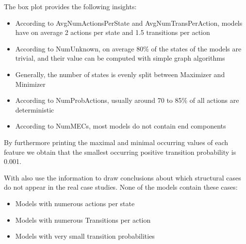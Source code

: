 \FloatBarrier
The box plot provides the following insights:
\begin{itemize} \label{insights:realDistribution}
    \item According to AvgNumActionsPerState and AvgNumTransPerAction, models have on average 2 actions per state and 1.5 transitions per action
    \item According to NumUnknown, on average 80\% of the states of the models are trivial, and their value can be computed with simple graph algorithms 
    \item Generally, the number of states is evenly split between Maximizer and Minimizer
    \item According to NumProbActions, usually around 70 to 85\% of all actions are deterministic
    \item According to NumMECs, most models do not contain end components
\end{itemize}

By furthermore printing the maximal and minimal occurring values of each feature we obtain that the smallest occurring positive transition probability is 0.001.

With also use the information to draw conclusions about which structural cases do not appear in the real case studies. 
None of the models contain these cases:
\begin{itemize}
    \item Models with numerous actions per state
    \item Models with numerous Transitions per action
    \item Models with very small transition probabilities
\end{itemize}

